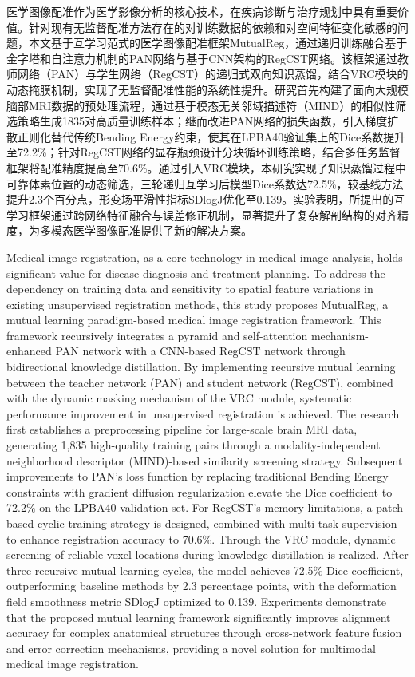 \begin{cabstract}

  医学图像配准作为医学影像分析的核心技术，在疾病诊断与治疗规划中具有重要价值。针对现有无监督配准方法存在的对训练数据的依赖和对空间特征变化敏感的问题，本文基于互学习范式的医学图像配准框架MutualReg，通过递归训练融合基于金字塔和自注意力机制的PAN网络与基于CNN架构的RegCST网络。该框架通过教师网络（PAN）与学生网络（RegCST）的递归式双向知识蒸馏，结合VRC模块的动态掩膜机制，实现了无监督配准性能的系统性提升。研究首先构建了面向大规模脑部MRI数据的预处理流程，通过基于模态无关邻域描述符（MIND）的相似性筛选策略生成1835对高质量训练样本；继而改进PAN网络的损失函数，引入梯度扩散正则化替代传统Bending Energy约束，使其在LPBA40验证集上的Dice系数提升至72.2\%；针对RegCST网络的显存瓶颈设计分块循环训练策略，结合多任务监督框架将配准精度提高至70.6\%。通过引入VRC模块，本研究实现了知识蒸馏过程中可靠体素位置的动态筛选，三轮递归互学习后模型Dice系数达72.5\%，较基线方法提升2.3个百分点，形变场平滑性指标SDlogJ优化至0.139。实验表明，所提出的互学习框架通过跨网络特征融合与误差修正机制，显著提升了复杂解剖结构的对齐精度，为多模态医学图像配准提供了新的解决方案。
\end{cabstract}

\begin{eabstract}
  Medical image registration, as a core technology in medical image analysis, holds significant value for disease diagnosis and treatment planning. To address the dependency on training data and sensitivity to spatial feature variations in existing unsupervised registration methods, this study proposes MutualReg, a mutual learning paradigm-based medical image registration framework. This framework recursively integrates a pyramid and self-attention mechanism-enhanced PAN network with a CNN-based RegCST network through bidirectional knowledge distillation. By implementing recursive mutual learning between the teacher network (PAN) and student network (RegCST), combined with the dynamic masking mechanism of the VRC module, systematic performance improvement in unsupervised registration is achieved. The research first establishes a preprocessing pipeline for large-scale brain MRI data, generating 1,835 high-quality training pairs through a modality-independent neighborhood descriptor (MIND)-based similarity screening strategy. Subsequent improvements to PAN's loss function by replacing traditional Bending Energy constraints with gradient diffusion regularization elevate the Dice coefficient to 72.2\% on the LPBA40 validation set. For RegCST's memory limitations, a patch-based cyclic training strategy is designed, combined with multi-task supervision to enhance registration accuracy to 70.6\%. Through the VRC module, dynamic screening of reliable voxel locations during knowledge distillation is realized. After three recursive mutual learning cycles, the model achieves 72.5\% Dice coefficient, outperforming baseline methods by 2.3 percentage points, with the deformation field smoothness metric SDlogJ optimized to 0.139. Experiments demonstrate that the proposed mutual learning framework significantly improves alignment accuracy for complex anatomical structures through cross-network feature fusion and error correction mechanisms, providing a novel solution for multimodal medical image registration.
\end{eabstract}

